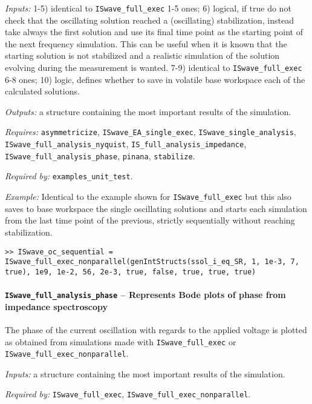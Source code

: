 	\textit{Inputs:} 1-5) identical to \texttt{ISwave\_full\_exec} 1-5 ones;
	6) logical, if true do not check that the oscillating solution reached a
	(oscillating) stabilization, instead take always the first solution
	and use its final time point as the starting point of the next
	frequency simulation. This can be useful when it is known that the
	starting solution is not stabilized and a realistic simulation of the
	solution evolving during the measurement is wanted.
	7-9) identical to \texttt{ISwave\_full\_exec} 6-8 ones;
	10) logic, defines whether to save in volatile base
	workspace each of the calculated solutions.

	\textit{Outputs:} a structure containing the most important results of the simulation.

	\textit{Requires:} \texttt{asymmetricize}, \texttt{ISwave\_EA\_single\_exec},
	\texttt{ISwave\_single\_analysis}, \texttt{ISwave\_full\_analysis\_nyquist},
	\texttt{IS\_full\_analysis\_impedance}, \texttt{ISwave\_full\_analysis\_phase}, \texttt{pinana},
	\texttt{stabilize}.

	\textit{Required by:} \texttt{examples\_unit\_test}.

	\textit{Example:} Identical to the example shown for \texttt{ISwave\_full\_exec} but this also saves to base workspace the single oscillating solutions and starts each simulation from the last time point of the previous, strictly sequentially without reaching stabilization.
	\begin{lstlisting}[style=Matlab-editor]
>> ISwave_oc_sequential = ISwave_full_exec_nonparallel(genIntStructs(ssol_i_eq_SR, 1, 1e-3, 7, true), 1e9, 1e-2, 56, 2e-3, true, false, true, true, true)
\end{lstlisting}

	\paragraph{\texttt{ISwave\_full\_analysis\_phase} -- Represents Bode plots of phase from impedance spectroscopy}
	The phase of the current oscillation with regards to the applied voltage is plotted as obtained from simulations made with \texttt{ISwave\_full\_exec} or \texttt{ISwave\_full\_exec\_nonparallel}.


	\textit{Inputs:} a structure containing the most important results of the simulation.



	\textit{Required by:} \texttt{ISwave\_full\_exec}, \texttt{ISwave\_full\_exec\_nonparallel}.



